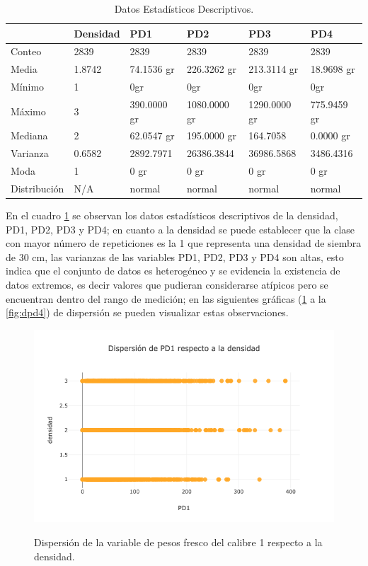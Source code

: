 \begin{table}[htbp]
\begin{center}
\begin{tabular}{|l|l|l|l|l|l|}
\hline
& Densidad & PD1 & PD2 & PD3 & PD4  \\
\hline \hline
Conteo & 2839 & 2839 & 2839 & 2839 & 2839  \\ \hline
Media & 1.8742 & 74.1536 gr & 226.3262 gr & 213.3114 gr & 18.9698 gr  \\ \hline
Mínimo & 1 & 0gr & 0gr & 0gr & 0gr  \\ \hline
Máximo & 3 & 390.0000 gr & 1080.0000 gr & 1290.0000 gr & 775.9459 gr  \\ \hline
Mediana & 2 & 62.0547 gr &195.0000 gr & 164.7058 & 0.0000 gr \\ \hline
Varianza & 0.6582 & 2892.7971 & 26386.3844 & 36986.5868 & 3486.4316 \\ \hline
Moda & 1 & 0 gr & 0 gr &  0 gr & 0 gr  \\ \hline
Distribución & N/A & normal & normal & normal & normal  \\ \hline
\end{tabular}
\caption{Datos Estadísticos Descriptivos.}
\label{tabla:descriptivos}
\end{center}
\end{table}
En el cuadro \ref{tabla:descriptivos} se observan los datos estadísticos descriptivos de la densidad, PD1, PD2, PD3 y PD4; en cuanto a la densidad se puede establecer que la clase con mayor número de repeticiones es la 1 que representa una densidad de siembra de 30 cm, las varianzas de las variables PD1, PD2, PD3 y PD4 son altas, esto indica que el conjunto de datos es heterogéneo y se evidencia la existencia de datos extremos, es decir valores que pudieran considerarse atípicos pero se encuentran dentro del rango de medición;  en las siguientes gráficas (\ref{fig:dpd1} a la \ref{fig:dpd4}) de dispersión se pueden visualizar estas observaciones.\\

\begin{figure}[h!]
	\caption{Dispersión de la variable de pesos fresco del calibre 1 respecto a la densidad.}
	\centering
	\includegraphics[scale=0.5]{d-pd1.png}
	\label{fig:dpd1}
\end{figure}

